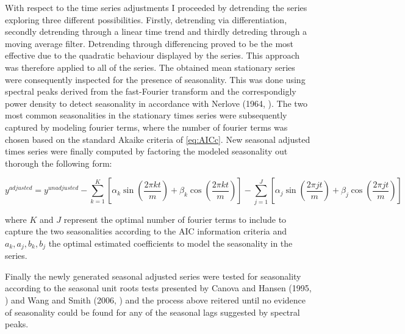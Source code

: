 With respect to the time series adjustments I proceeded by detrending
the series exploring three different possibilities. Firstly,
detrending via differentiation, secondly detrending through a linear
time trend and thirdly detreding through a moving average
filter. Detrending through differencing proved to be the most
effective due to the quadratic behaviour displayed by the series. This
approach was therefore applied to all of the series.  The obtained
mean stationary series were consequently inspected for the presence of
seasonality. This was done using spectral peaks derived from the
fast-Fourier transform and the correspondigly power density to detect
seasonality in accordance with Nerlove (1964, \cite{Nerlove}). The two
most common seasonalities in the stationary times series were
subsequently captured by modeling fourier terms, where the number of
fourier terms was chosen based on the standard Akaike criteria of
\ref{eq:AICc}. New seasonal adjusted times series were finally
computed by factoring the modeled seasonality out thorough the
following form:

\begin{equation} \label{eq:seasonal adjustment}
  y^{adjusted} = y^{unadjusted} - \sum_{k=1}^K [ \alpha_k \sin(\frac{2 \pi kt}{m}) + \beta_k \cos(\frac{2 \pi kt}{m}) ] - \sum_{j=1}^J [ \alpha_j \sin(\frac{2 \pi jt}{m}) + \beta_j \cos(\frac{2 \pi jt}{m}) ]
\end{equation}

where $K$ and $J$ represent the optimal number of fourier terms to
include to capture the two seasonalities according to the AIC
information criteria and $a_k, a_j, b_k, b_j$ the optimal estimated
coefficients to model the seasonality in the series.

Finally the newly generated seasonal adjusted series were tested for
seasonality according to the seasonal unit roots tests presented by
Canova and Hansen (1995, \cite{CanovaHansen}) and Wang and Smith
(2006, \cite{WangSmith}) and the process above reitered until no
evidence of seasonality could be found for any of the seasonal lags
suggested by spectral peaks.
